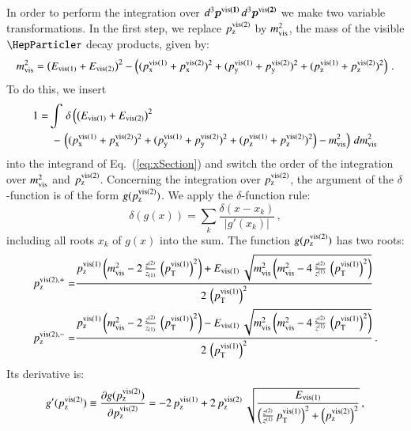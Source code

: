 In order to perform the integration over $d^{3}\bm{p^{\textrm{vis}(1)}} \, d^{3}\bm{p^{\textrm{vis}(2)}}$ we make two variable transformations.
In the first step,
we replace $p_{\textrm{z}}^{\textrm{vis}(2)}$ by $m_{\textrm{vis}}^{2}$, the mass of the visible $\Pgt$ decay products, given by:
\begin{equation}
m_{\textrm{vis}}^{2} = 
  \left( E_{\textrm{vis}(1)} + E_{\textrm{vis}(2)} \right)^{2} 
- \left( (p_{\textrm{x}}^{\textrm{vis}(1)} + p_{\textrm{x}}^{\textrm{vis}(2)})^{2} + (p_{\textrm{y}}^{\textrm{vis}(1)} + p_{\textrm{y}}^{\textrm{vis}(2)})^{2} + (p_{\textrm{z}}^{\textrm{vis}(1)} + p_{\textrm{z}}^{\textrm{vis}(2)})^{2} \right) \, .
\label{eq:m_vis}
\end{equation}
To do this, we insert
\begin{align}
1 = & \int \, \delta\left(
  \left( E_{\textrm{vis}(1)} + E_{\textrm{vis}(2)} \right)^{2} \right. \nonumber \\ 
& \
 - \left. \left( (p_{\textrm{x}}^{\textrm{vis}(1)} + p_{\textrm{x}}^{\textrm{vis}(2)})^{2} + (p_{\textrm{y}}^{\textrm{vis}(1)} + p_{\textrm{y}}^{\textrm{vis}(2)})^{2} + (p_{\textrm{z}}^{\textrm{vis}(1)} + p_{\textrm{z}}^{\textrm{vis}(2)})^{2} \right) - m_{\textrm{vis}}^{2} \right) \, dm_{\textrm{vis}}^{2} \nonumber
\end{align} 
into the integrand of Eq.~(\ref{eq:xSection}) and switch the order of the integration 
over $m_{\textrm{vis}}^{2}$ and $p_{\textrm{z}}^{\textrm{vis}(2)}$. 
Concerning the integration over $p_{\textrm{z}}^{\textrm{vis}(2)}$, the argument of the $\delta$-function is of the form $g(p_{\textrm{z}}^{\textrm{vis}(2)})$.
We apply the $\delta$-function rule:
\begin{equation} 
\delta \left( g(x) \right) = \sum_{k} \frac{\delta \left( x - x_{k}
  \right)}{\vert g'(x_{k}) \vert} \, ,
\label{eq:deltaFuncRule}
\end{equation}
including all roots $x_{k}$ of $g(x)$ into the sum.
The function $g(p_{\textrm{z}}^{\textrm{vis}(2)})$ has two roots:
\begin{align} 
p_{\textrm{z}}^{\textrm{vis}(2),+} = & \frac{p_{\textrm{z}}^{\textrm{vis}(1)} \left(m_{\textrm{vis}}^{2} - 2 \,
  \frac{z^{(2)}}{z_{(1)}} \, \left(p_{\textrm{T}}^{\textrm{vis}(1)}\right)^{2}\right) + E_{\textrm{vis}(1)} \,
  \sqrt{m_{\textrm{vis}}^{2} \left(m_{\textrm{vis}}^{2} - 4 \, \frac{z^{(2)}}{z^{(1)}} \, \left(p_{\textrm{T}}^{\textrm{vis}(1)}\right)^{2}\right)}}{2 \, \left(p_{\textrm{T}}^{\textrm{vis}(1)}\right)^{2}} \nonumber \\
p_{\textrm{z}}^{\textrm{vis}(2),-} = & \frac{p_{\textrm{z}}^{\textrm{vis}(1)} \left(m_{\textrm{vis}}^{2} - 2 \,
  \frac{z^{(2)}}{z_{(1)}} \, \left(p_{\textrm{T}}^{\textrm{vis}(1)}\right)^{2}\right) - E_{\textrm{vis}(1)} \,
  \sqrt{m_{\textrm{vis}}^{2} \left(m_{\textrm{vis}}^{2} - 4 \, \frac{z^{(2)}}{z^{(1)}} \, \left(p_{\textrm{T}}^{\textrm{vis}(1)}\right)^{2}\right)}}{2 \, \left(p_{\textrm{T}}^{\textrm{vis}(1)}\right)^{2}} \, .
\label{eq:pzMapping}
\end{align}
Its derivative is:
\begin{equation} 
g'(p_{\textrm{z}}^{\textrm{vis}(2)}) \equiv 
  \frac{\partial g(p_{\textrm{z}}^{\textrm{vis}(2)})}{\partial p_{\textrm{z}}^{\textrm{vis}(2)}} = 
 - 2 \, p_{\textrm{z}}^{\textrm{vis}(1)} 
 + 2 \, p_{\textrm{z}}^{\textrm{vis}(2)} \, \sqrt{\frac{E_{\textrm{vis}(1)}}{\left( \frac{z^{(2)}}{z^{(1)}} \, p_{\textrm{T}}^{\textrm{vis}(1)} \right)^{2} + \left(p_{\textrm{z}}^{\textrm{vis}(2)}\right)^{2}}} \, ,
\end{equation}
